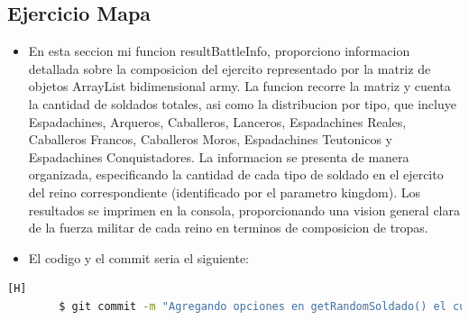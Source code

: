 \documentclass{article}
\begin{document}
	\subsection{Ejercicio Mapa}
	\begin{itemize}	
		\item En esta seccion mi funcion resultBattleInfo, proporciono informacion detallada sobre la composicion del ejercito representado por la matriz de objetos ArrayList bidimensional army. La funcion recorre la matriz y cuenta la cantidad de soldados totales, asi como la distribucion por tipo, que incluye Espadachines, Arqueros, Caballeros, Lanceros, Espadachines Reales, Caballeros Francos, Caballeros Moros, Espadachines Teutonicos y Espadachines Conquistadores. La informacion se presenta de manera organizada, especificando la cantidad de cada tipo de soldado en el ejercito del reino correspondiente (identificado por el parametro kingdom). Los resultados se imprimen en la consola, proporcionando una vision general clara de la fuerza militar de cada reino en terminos de composicion de tropas.
		\item El codigo y el commit seria el siguiente:
	\end{itemize}	
	\begin{lstlisting}[language=bash,caption={Commit}][H]
		$ git commit -m "Agregando opciones en getRandomSoldado() el cual serian estas clases heredadas anteriormente respetando si estas pertenecen a cierto reino especifico tambien modificamos el metodo obtenerIncial() el cual tambien agregamos las inciales de cada tipo de Soldado y tambien en el metodo fillarray() el cual creara a cada soldado dependiendo el tipo que sea con un constructor seria solo agregar mas clases heredadas en resumen "
	\end{lstlisting}	
\end{document}
